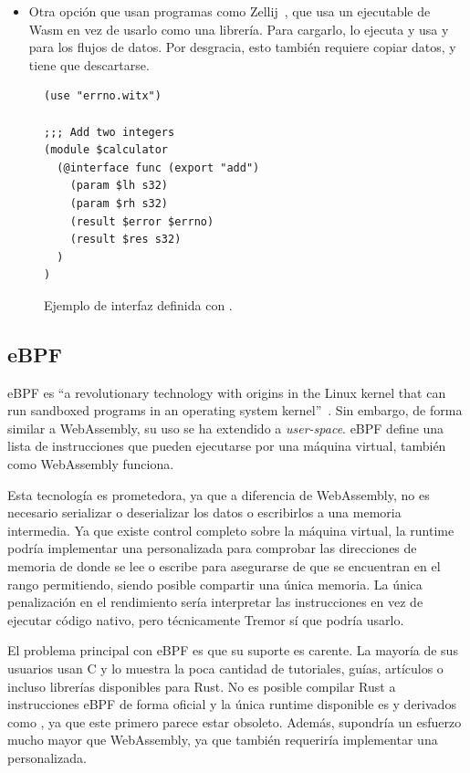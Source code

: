 \begin{itemize}
    \item Otra opción que usan programas como Zellij~\cite{zellijpluginsystem},
        que usa un ejecutable de Wasm en vez de usarlo como una librería. Para
        cargarlo, lo ejecuta y usa \stdin y \stdout para los flujos de datos.
        Por desgracia, esto también requiere copiar datos, y tiene que
        descartarse.

\end{itemize}

\begin{figure}
    \centering
    \begin{verbatim}
(use "errno.witx")

;;; Add two integers
(module $calculator
  (@interface func (export "add")
    (param $lh s32)
    (param $rh s32)
    (result $error $errno)
    (result $res s32)
  )
)
    \end{verbatim}
    \caption{Ejemplo de interfaz definida con .}%
    \label{fig:witx_example}
\end{figure}

\subsection{eBPF}

eBPF es ``a revolutionary technology with origins in the Linux kernel that can
run sandboxed programs in an operating system kernel''~\cite{ebpf}. Sin embargo,
de forma similar a WebAssembly, su uso se ha extendido a \emph{user-space}. eBPF
define una lista de instrucciones que pueden ejecutarse por una máquina virtual,
también como WebAssembly funciona.

Esta tecnología es prometedora, ya que a diferencia de WebAssembly, no es
necesario serializar o deserializar los datos o escribirlos a una memoria
intermedia. Ya que existe control completo sobre la máquina virtual, la runtime
podría implementar una \sandbox personalizada para comprobar las direcciones de
memoria de donde se lee o escribe para asegurarse de que se encuentran en el
rango permitiendo, siendo posible compartir una única memoria. La única
penalización en el rendimiento sería interpretar las instrucciones en vez de
ejecutar código nativo, pero técnicamente Tremor sí que podría usarlo.

El problema principal con eBPF es que su suporte es carente. La mayoría de sus
usuarios usan C y lo muestra la poca cantidad de tutoriales, guías, artículos o
incluso librerías disponibles para Rust. No es posible compilar Rust a
instrucciones eBPF de forma oficial y la única runtime disponible es
 y derivados como , ya que este primero
parece estar obsoleto. Además, supondría un esfuerzo mucho mayor que
WebAssembly, ya que también requeriría implementar una \sandbox personalizada.

